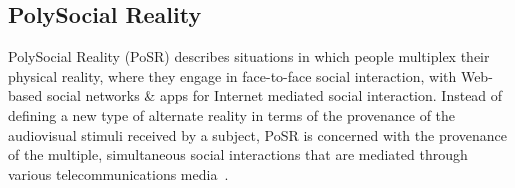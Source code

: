









\subsection{PolySocial Reality}

PolySocial Reality (PoSR) describes situations in which people multiplex their physical reality, where they engage in face-to-face social interaction, with Web-based social networks \& apps for Internet mediated social interaction. Instead of defining a new type of alternate reality in terms of the provenance of the audiovisual stimuli received by a subject, PoSR is concerned with the provenance of the multiple, simultaneous social interactions that are mediated through various telecommunications media~\cite{Applin2012}.

